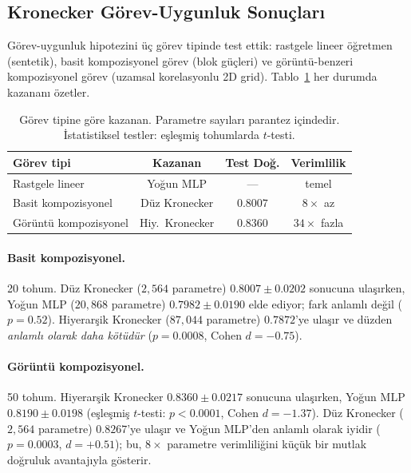 \documentclass[11pt,a4paper]{article}
\begin{document}
\subsection{Kronecker Görev-Uygunluk Sonuçları}
\label{sec:exp-kronecker}

Görev-uygunluk hipotezini üç görev tipinde test ettik: rastgele lineer
öğretmen (sentetik), basit kompozisyonel görev (blok güçleri) ve
görüntü-benzeri kompozisyonel görev (uzamsal korelasyonlu 2D grid).
Tablo~\ref{tab:kronecker} her durumda kazananı özetler.

\begin{table}[h]
\centering
\caption{Görev tipine göre kazanan. Parametre sayıları parantez
içindedir. İstatistiksel testler: eşleşmiş tohumlarda $t$-testi.}
\label{tab:kronecker}
\small
\begin{tabular}{lccc}
\toprule
Görev tipi & Kazanan & Test Doğ. & Verimlilik \\
\midrule
Rastgele lineer          & Yoğun MLP          & ---      & temel \\
Basit kompozisyonel      & Düz Kronecker      & $0.8007$ & $8\times$ az \\
Görüntü kompozisyonel    & Hiy.\ Kronecker    & $0.8360$ & $34\times$ fazla \\
\bottomrule
\end{tabular}
\end{table}

\paragraph{Basit kompozisyonel.}
20 tohum. Düz Kronecker ($2{,}564$ parametre) $0.8007 \pm 0.0202$
sonucuna ulaşırken, Yoğun MLP ($20{,}868$ parametre) $0.7982 \pm 0.0190$
elde ediyor; fark anlamlı değil ($p = 0.52$). Hiyerarşik Kronecker
($87{,}044$ parametre) $0.7872$'ye ulaşır ve düzden
\emph{anlamlı olarak daha kötüdür} ($p = 0.0008$, Cohen $d = -0.75$).

\paragraph{Görüntü kompozisyonel.}
50 tohum. Hiyerarşik Kronecker $0.8360 \pm 0.0217$ sonucuna ulaşırken,
Yoğun MLP $0.8190 \pm 0.0198$ (eşleşmiş $t$-testi:
$p < 0.0001$, Cohen $d = -1.37$). Düz Kronecker ($2{,}564$ parametre)
$0.8267$'ye ulaşır ve Yoğun MLP'den anlamlı olarak iyidir
($p = 0.0003$, $d = +0.51$); bu, $8\times$ parametre verimliliğini
küçük bir mutlak doğruluk avantajıyla gösterir.
\end{document}
